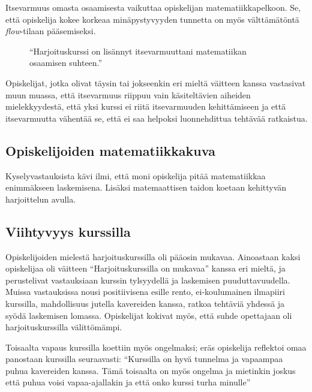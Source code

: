 Itsevarmuus omasta osaamisesta vaikuttaa opiskelijan matematiikkapelkoon.
Se, että opiskelija kokee korkeaa minäpystyvyyden tunnetta on myös välttämätöntä \emph{flow}-tilaan pääsemiseksi.

\begin{figure}[h!]
\centering
{}
\caption{``Harjoituskurssi on lisännyt itsevarmuuttani matematiikan osaamisen suhteen.''}
\end{figure}

Opiskelijat, jotka olivat täysin tai jokseenkin eri mieltä väitteen kanssa vastasivat muun muassa, että itsevarmuus riippuu vain käsiteltävien aiheiden mielekkyydestä, että yksi kurssi ei riitä itsevarmuuden kehittämiseen ja että itsevarmuutta vähentää se, että ei saa helpoksi luonnehdittua tehtävää ratkaistua.


\subsection{Opiskelijoiden matematiikkakuva}
Kyselyvastauksista kävi ilmi, että moni opiskelija pitää matematiikkaa enimmäkseen laskemisena.
Lisäksi matemaattisen taidon koetaan kehittyvän harjoittelun avulla.

\subsection{Viihtyvyys kurssilla}
Opiskelijoiden mielestä harjoituskurssilla oli pääosin mukavaa. Ainoastaan kaksi opiskelijaa oli väitteen ``Harjoituskurssilla on mukavaa'' kanssa eri mieltä, ja perustelivat vastauksiaan kurssin tylsyydellä ja laskemisen puuduttavuudella. Muissa vastauksissa nousi positiivisena esille rento, ei-koulumainen ilmapiiri kurssilla, mahdollisuus jutella kavereiden kanssa, ratkoa tehtäviä yhdessä ja syödä laskemisen lomassa. Opiskelijat kokivat myös, että suhde opettajaan oli harjoituskurssilla välittömämpi. 

Toisaalta vapaus kurssilla koettiin myös ongelmaksi; eräs opiskelija reflektoi omaa panostaan kurssilla seuraavasti: ``Kurssilla on hyvä tunnelma ja vapaampaa puhua kavereiden kanssa. Tämä toisaalta on myös ongelma ja mietinkin joskus että puhua voisi vapaa-ajallakin ja että onko kurssi turha minulle''

